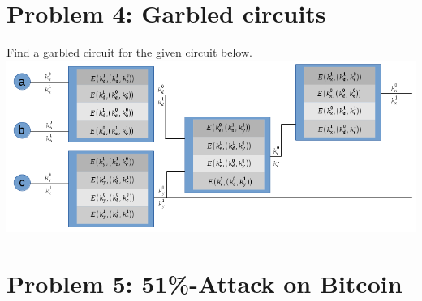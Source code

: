 \documentclass[12pt,pdftex,a4paper]{article}
\begin{document}
\section*{Problem 4: Garbled circuits}
Find a garbled circuit for the given circuit below.\\
\includegraphics[width=\textwidth]{./problem4_garbled_circuit.png}

\section*{Problem 5: 51\%-Attack on Bitcoin}
\end{document}
